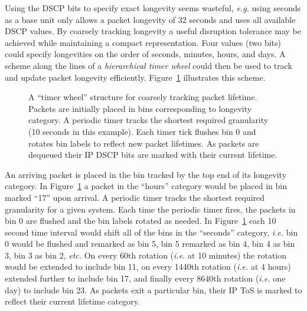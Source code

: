 \documentclass[10pt,letterpaper]{article}
\begin{document}
Using the DSCP bits to specify exact longevity seems
wasteful, {\em e.g.} using seconds as a base unit only allows
a packet longevity of 32 seconds and uses all available DSCP
values. By coarsely tracking longevity a useful disruption tolerance may be
achieved while maintaining a compact representation.
Four values (two bits) could specify
longevities on the order of seconds, minutes, hours, and days.
A scheme along the lines of a {\em hierarchical timer wheel}
could then be used to track and update packet longevity 
efficiently. Figure~\ref{figure:packet_timer_wheel} illustrates
this scheme.
\begin{figure}
\centerline{
}
\caption{\footnotesize A ``timer wheel'' structure for coarsely tracking
packet lifetime. Packets are initially placed in bins corresponding to
longevity category. A periodic timer tracks the shortest required granularity
(10 seconds in this example). Each timer tick flushes bin 0
and rotates bin labels to reflect new packet lifetimes. As packets
are dequeued their IP DSCP bits are marked with their current
lifetime.}
\label{figure:packet_timer_wheel}
\end{figure}
An arriving packet is placed in the bin tracked by the top
end of its longevity category. In Figure~\ref{figure:packet_timer_wheel}
a packet in the ``hours'' category would be placed in bin marked ``17'' upon
arrival. A periodic timer tracks the shortest required granularity for
a given system. Each time
the periodic timer fires, the packets in bin 0 are flushed and the bin
labels rotated as needed. In Figure~\ref{figure:packet_timer_wheel}
each 10 second time interval would shift all of the bins in the
``seconds'' category, {\em i.e.} bin 0 would be flushed and remarked as bin 5,
bin 5 remarked as bin 4, bin 4 as bin 3, bin 3 as bin 2, {\em etc.}
On every 60th rotation ({\em i.e.} at 10 minutes) the rotation would be
extended to include bin 11, on every 1440th rotation ({\em i.e.} at 4 hours)
extended further to include bin 17, and finally every 8640th rotation
({\em i.e.} one day) to include bin 23. As packets exit a particular bin,
their IP ToS is marked to reflect their current lifetime category.
\end{document}
